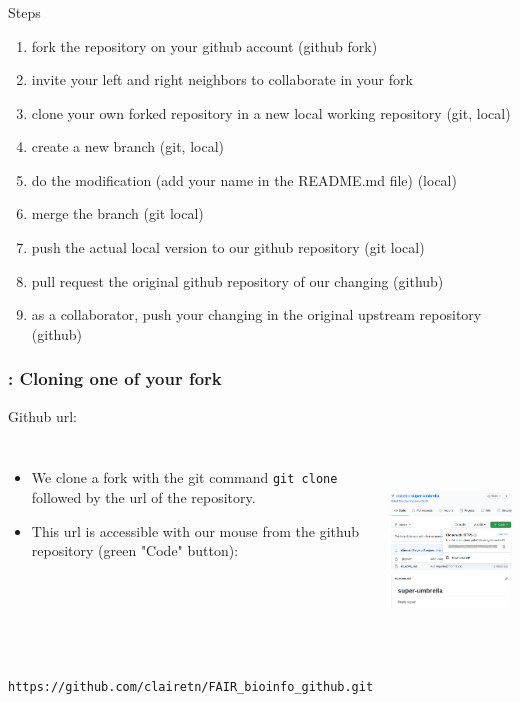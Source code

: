 \begin{frame}[containsverbatim]
\frametitle{}
\begin{exampleblock}{Steps}
\begin{enumerate}
    \item fork the repository on your github account (github fork)
    \item invite your left and right neighbors to collaborate in your fork
    \item clone your own forked repository in a new local working repository (git, local)
    \item create a new branch (git, local)
    \item do the modification (add your name in the README.md file) (local)
    \item merge the branch (git local)
    \item push the actual local version to our github repository (git local)
    \item pull request the original github repository of our changing (github)
    \item as a collaborator, push your changing in the original upstream repository (github)
\end{enumerate}
\end{exampleblock}
\end{frame}
\begin{frame}[containsverbatim]
\frametitle{: Cloning one of your fork}
\begin{exampleblock}{Github url:}
\begin{columns}
\begin{itemize}
    \item We clone a fork with the git command \verb|git clone| followed by the url of the repository.
    \item This url is accessible with our mouse from the github repository (green "Code" button):
\end{itemize}
\begin{center}
    \includegraphics[height=5cm]{05_history/Images/FAIR_github_clone.png}
\end{center}
\end{columns}
\begin{center}
    \small{\verb|https://github.com/clairetn/FAIR_bioinfo_github.git|}
\end{center}
\end{exampleblock}
\end{frame}

